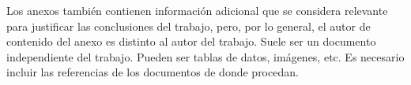 

Los anexos también contienen información adicional que se considera relevante para justificar las conclusiones del trabajo, pero, por lo general, el autor de contenido del anexo es distinto al autor del trabajo. Suele ser un documento independiente del trabajo. Pueden ser tablas de datos, imágenes, etc. Es necesario incluir las referencias de los documentos de donde procedan.
